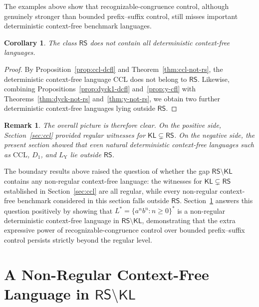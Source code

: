 \documentclass[11pt,a4paper]{article}
\newtheorem{corollary}[theorem]{Corollary}
\newtheorem{remark}[theorem]{Remark}
\begin{document}
The examples above show that recognizable-congruence control, although genuinely stronger than bounded prefix--suffix control, still misses important deterministic context-free benchmark languages.

\begin{corollary}\label{cor:dcfl-not-rs}
The class $\mathsf{RS}$ does not contain all deterministic context-free languages.
\end{corollary}

\begin{proof}
By Proposition~\ref{prop:ccl-dcfl} and Theorem~\ref{thm:ccl-not-rs}, the deterministic context-free language $\mathrm{CCL}$ does not belong to $\mathsf{RS}$. Likewise, combining Propositions~\ref{prop:dyck1-dcfl} and~\ref{prop:y-cfl} with Theorems~\ref{thm:dyck-not-rs} and~\ref{thm:y-not-rs}, we obtain two further deterministic context-free languages lying outside $\mathsf{RS}$.
\end{proof}

\begin{remark}
The overall picture is therefore clear. On the positive side, Section~\ref{sec:ccl} provided regular witnesses for $\mathsf{KL}\subsetneq\mathsf{RS}$. On the negative side, the present section showed that even natural deterministic context-free languages such as $\mathrm{CCL}$, $D_1$, and $L_{\mathrm{Y}}$ lie outside $\mathsf{RS}$.
\end{remark}

The boundary results above raised the question of whether the gap
$\mathsf{RS} \setminus \mathsf{KL}$ contains any non-regular context-free
language: the witnesses for $\mathsf{KL} \subsetneq \mathsf{RS}$ established
in Section~\ref{sec:ccl} are all regular, while every non-regular
context-free benchmark considered in this section falls outside $\mathsf{RS}$.
Section~\ref{sec:lstar} answers this question positively by showing that
$L^* = \{a^n b^n : n \geq 0\}^*$ is a non-regular deterministic
context-free language in $\mathsf{RS} \setminus \mathsf{KL}$, demonstrating
that the extra expressive power of recognizable-congruence control over
bounded prefix--suffix control persists strictly beyond the regular level.


\section{A Non-Regular Context-Free Language in
  \texorpdfstring{$\mathsf{RS}\setminus\mathsf{KL}$}{RS minus KL}}
\label{sec:lstar}
\end{document}
